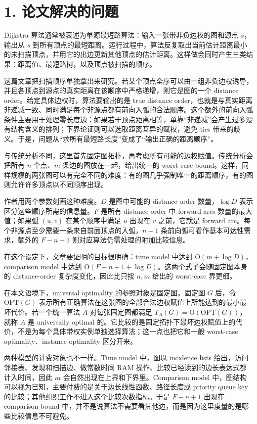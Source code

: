 \section*{1. 论文解决的问题}
Dijkstra 算法通常被表述为单源最短路算法：输入一张带非负边权的图和源点 \(s\)，输出从 \(s\) 到所有顶点的最短距离。运行过程中，算法反复取出当前估计距离最小的未扫描顶点，并用它的出边更新其他顶点的估计距离。这样做会同时产生三类结果：距离值、最短路树，以及顶点被扫描的顺序。

这篇文章把扫描顺序单独拿出来研究。若某个顶点全序可以由一组非负边权诱导，并且各顶点到源点的真实距离在该顺序中严格递增，则它是图的一个 distance order。给定具体边权时，算法要输出的是 true distance order，也就是与真实距离非递减一致、同时满足每个非源点都有前向入弧的合法顺序。这个额外的前向入弧条件主要用于处理零长度边：如果若干顶点距离相等，单靠“非递减”会产生过多没有结构含义的排列；下界论证则可以选取距离互异的赋权，避免 ties 带来的歧义。于是，问题从“求所有最短路长度”变成了“输出正确的距离顺序”。

与传统分析不同，这里首先固定图拓扑，再考虑所有可能的边权赋值。传统分析会把所有 \(n\) 个点、\(m\) 条边的图放在一起，给出统一的 worst-case bound。这样，同样规模的两张图可以有完全不同的难度：有的图几乎强制唯一的距离顺序，有的图则允许许多顶点以不同顺序出现。

作者用两个参数刻画这种难度。\(D\) 是图中可能的 distance order 数量，\(\log D\) 表示区分这些顺序所需的信息量。\(F\) 是所有 distance order 中 forward arcs 数量的最大值；如果弧 \((u,v)\) 在某个顺序中满足 \(u\) 出现在 \(v\) 之前，它就是 forward arc。每个非源点至少需要一条来自前面顶点的入弧，\(n-1\) 条前向弧可看作基本可达性需求，额外的 \(F-n+1\) 则对应算法仍需处理的附加比较信息。

在这个设定下，文章要证明的目标很明确：time model 中达到 \(\mathrm{O}(m+\log D)\)，comparison model 中达到 \(\mathrm{O}(F-n+1+\log D)\)。这两个式子会随固定图本身的 distance-order 复杂度变化，因此比只按 \(n,m\) 给出的 worst-case 界更细。

在本文语境下，universal optimality 的参照对象是固定图。固定图 \(G\) 后，令 \(\mathrm{OPT}(G)\) 表示所有正确算法在这张图的全部合法边权赋值上所能达到的最小最坏代价。若一个统一算法 \(A\) 对每张固定图都满足 \(T_A(G)=\mathrm{O}(\mathrm{OPT}(G))\)，就称 \(A\) 是 universally optimal 的。它比较的是固定拓扑下最坏边权赋值上的代价，不是为每个具体带权实例单独选择算法；这一点也把它和一般 worst-case optimality、instance optimality 区分开来。

两种模型的计费对象也不一样。Time model 中，图以 incidence lists 给出，访问邻接表、发现和扫描边、做常数时间 RAM 操作、比较已经读到的边长表达式都计入时间，因此 \(m\) 会自然出现在上界和下界里。Comparison model 中，图结构可以视为已知，主要付费的是关于边长线性函数、路径长度或 priority queue key 的比较；其他组织工作不进入这个比较次数指标。于是 \(F-n+1\) 出现在 comparison bound 中，并不是说算法不需要看其他边，而是因为这里度量的是哪些比较信息不可避免。
